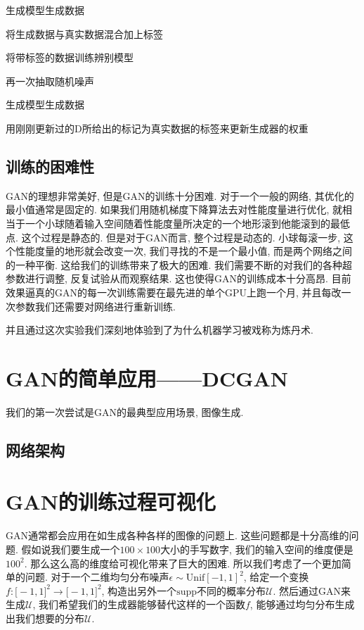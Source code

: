 \documentclass[lang=cn,11pt]{elegantpaper}
\begin{document}
生成模型生成数据

将生成数据与真实数据混合加上标签

将带标签的数据训练辨别模型

再一次抽取随机噪声

生成模型生成数据

用刚刚更新过的D所给出的标记为真实数据的标签来更新生成器的权重

\subsection{训练的困难性}

GAN的理想非常美好, 但是GAN的训练十分困难. 对于一个一般的网络, 其优化的最小值通常是固定的. 如果我们用随机梯度下降算法去对性能度量进行优化, 就相当于一个小球随着输入空间随着性能度量所决定的一个地形滚到他能滚到的最低点. 这个过程是静态的. 但是对于GAN而言, 整个过程是动态的. 小球每滚一步, 这个性能度量的地形就会改变一次, 我们寻找的不是一个最小值, 而是两个网络之间的一种平衡. 这给我们的训练带来了极大的困难. 我们需要不断的对我们的各种超参数进行调整, 反复试验从而观察结果. 这也使得GAN的训练成本十分高昂. 目前效果逼真的GAN的每一次训练需要在最先进的单个GPU上跑一个月, 并且每改一次参数我们还需要对网络进行重新训练. 

并且通过这次实验我们深刻地体验到了为什么机器学习被戏称为炼丹术. 


\section{GAN的简单应用——DCGAN}

我们的第一次尝试是GAN的最典型应用场景, 图像生成.

\subsection{网络架构}




\section{GAN的训练过程可视化}

GAN通常都会应用在如生成各种各样的图像的问题上. 这些问题都是十分高维的问题. 假如说我们要生成一个$100\times 100$大小的手写数字, 我们的输入空间的维度便是$100^2$. 那么这么高的维度给可视化带来了巨大的困难. 所以我们考虑了一个更加简单的问题. 对于一个二维均匀分布噪声$\epsilon \sim \mathrm{Unif}[-1,1]^2$, 给定一个变换$f:\mathbb [-1,1]^2 \to \mathbb [-1,1]^2$, 构造出另外一个$\mathrm{supp}$不同的概率分布$\mathcal U$. 然后通过GAN来生成$\mathcal U$, 我们希望我们的生成器能够替代这样的一个函数$f$, 能够通过均匀分布生成出我们想要的分布$\mathcal U$.
\end{document}
